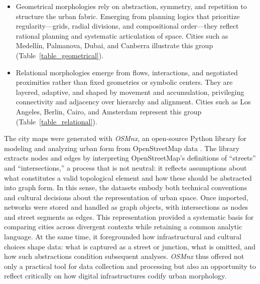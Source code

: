 \documentclass[land,article,accept,pdftex,oneauthor]{Definitions/mdpi}
\begin{document}
{\begin{itemize}
    \item {Geometrical} morphologies rely on abstraction, symmetry, and repetition to structure the urban fabric. Emerging from planning logics that prioritize regularity---grids, radial divisions, and compositional order---they reflect rational planning and systematic articulation of space. Cities such as Medellín, Palmanova, Dubai, and Canberra illustrate this group (Table~\ref{table_geometrical}).  

    \item {Relational} morphologies emerge from flows, interactions, and negotiated proximities rather than fixed geometries or symbolic centers. They are layered, adaptive, and shaped by movement and accumulation, privileging connectivity and adjacency over hierarchy and alignment. Cities such as Los Angeles, Berlin, Cairo, and Amsterdam represent this group (Table~\ref{table_relational}).  
\end{itemize}


{The} %
city maps were generated with \textit{OSMnx}, an open-source  {Python} %
 library for modeling and analyzing urban form from OpenStreetMap data \cite{boeing_modeling_2025}. The library extracts nodes and edges by interpreting OpenStreetMap’s definitions of “streets” and “intersections,” a process that is not neutral: it reflects assumptions about what constitutes a valid topological element and how these should be abstracted into graph form. In this sense, the datasets embody both technical conventions and cultural decisions about the representation of urban space. Once imported, networks were stored and handled as graph objects, with intersections as nodes and street segments as edges. This representation provided a systematic basis for comparing cities across divergent contexts while retaining a common analytic language. At the same time, it foregrounded how infrastructural and cultural choices shape data: what is captured as a street or junction, what is omitted, and how such abstractions condition subsequent analyses. \textit{OSMnx} thus offered not only a practical tool for data collection and processing but also an opportunity to reflect critically on how digital infrastructures codify urban morphology.


}
\end{document}
